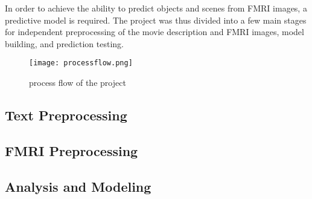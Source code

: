 \par In order to achieve the ability to predict objects and scenes 
from FMRI images, a predictive model is required. The project was thus 
divided into a few main stages for independent preprocessing of the 
movie description and FMRI images, model building, and prediction
testing.

\begin{figure}[!htbp]
\centering
\texttt{[image: processflow.png]}
\caption{\label{fig:processflow} process flow of the project}
\end{figure}

\subsection{Text Preprocessing}


\subsection{FMRI Preprocessing}


\subsection{Analysis and Modeling}

\break 
\break